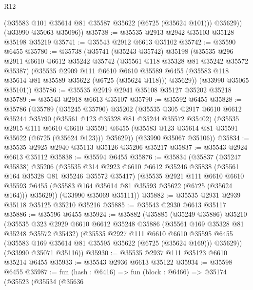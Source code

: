 \begin{lexlean}{R12}
\begin{coremodule}
          (@35583 @101 @35614 @81 @35587 @35622 (@6725 (@35624 @101)))
          @35629))
      (@33990 @35063 @35096))
@35738 := @35535 @2913 @2942 @35103 @35128 @35198 @35219
@35741 := @35543 @2912 @6613 @35102
@35742 := @35590 @6455
@35780 := @35738
    (@35741
      (@35243 @35742)
      @35198
      (@35535
        @296
        @2911
        @6610
        @6612
        @35242
        @35742
        (@35561 @118 @35328 @81 @35242 @35572 @35387)
        (@35535
          @2909
          @111
          @6610
          @6610
          @35589
          @6455
          (@35583 @118 @35614 @81 @35589 @35622 (@6725 (@35624 @118)))
          @35629))
      (@33990 @35065 @35101))
@35786 := @35535 @2919 @2941 @35108 @35127 @35202 @35218
@35789 := @35543 @2918 @6613 @35107
@35790 := @35592 @6455
@35828 := @35786
    (@35789
      (@35245 @35790)
      @35202
      (@35535
        @305
        @2917
        @6610
        @6612
        @35244
        @35790
        (@35561 @123 @35328 @81 @35244 @35572 @35402)
        (@35535
          @2915
          @111
          @6610
          @6610
          @35591
          @6455
          (@35583 @123 @35614 @81 @35591 @35622 (@6725 (@35624 @123)))
          @35629))
      (@33990 @35067 @35106))
@35834 := @35535 @2925 @2940 @35113 @35126 @35206 @35217
@35837 := @35543 @2924 @6613 @35112
@35838 := @35594 @6455
@35876 := @35834
    (@35837
      (@35247 @35838)
      @35206
      (@35535
        @314
        @2923
        @6610
        @6612
        @35246
        @35838
        (@35561 @164 @35328 @81 @35246 @35572 @35417)
        (@35535
          @2921
          @111
          @6610
          @6610
          @35593
          @6455
          (@35583 @164 @35614 @81 @35593 @35622 (@6725 (@35624 @164)))
          @35629))
      (@33990 @35069 @35111))
@35882 := @35535 @2931 @2939 @35118 @35125 @35210 @35216
@35885 := @35543 @2930 @6613 @35117
@35886 := @35596 @6455
@35924 := @35882
    (@35885
      (@35249 @35886)
      @35210
      (@35535
        @323
        @2929
        @6610
        @6612
        @35248
        @35886
        (@35561 @169 @35328 @81 @35248 @35572 @35432)
        (@35535
          @2927
          @111
          @6610
          @6610
          @35595
          @6455
          (@35583 @169 @35614 @81 @35595 @35622 (@6725 (@35624 @169)))
          @35629))
      (@33990 @35071 @35116))
@35930 := @35535 @2937 @111 @35123 @6610 @35214 @6455
@35933 := @35543 @2936 @6613 @35122
@35934 := @35598 @6455
@35987 := fun (hash : @6416) =>
  fun (block : @6466) =>
  @35174
    (@35523
      (@35534
        (@35636

\end{coremodule}
\end{lexlean}

